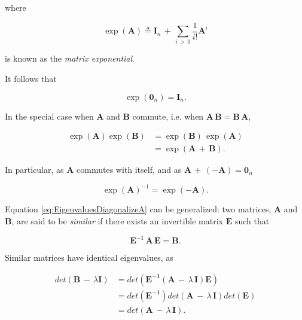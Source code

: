 \documentclass[graybox,envcountchap,sectrefs]{svmono}\usepackage[]{graphicx}\usepackage[]{xcolor}
\begin{document}
\begin{appendices}
where 

\begin{equation}
\exp\left(\mathrm{\mathbf{A}}\right)\triangleq\mathbf{I}_{n}\,+\,\sum_{i\,>\,0}\frac{1}{i!}\mathrm{\mathbf{A}}^{i}\label{eq:MatrixExponential}
\end{equation}
 

is known as the \emph{matrix exponential}. 

It follows that

\begin{equation}
\exp\left(\mathrm{\mathbf{0}}_{n}\right)=\mathbf{I}_{n}.\label{eq:MatrixExponential0}
\end{equation}

In the special case when $\mathbf{A}$ and $\mathbf{B}$ commute,
i.e. when $\mathbf{A}\,\mathbf{B}=\mathbf{B}\,\mathbf{A}$,

\begin{align}
\exp\left(\mathrm{\mathbf{A}}\right)\exp\left(\mathrm{\mathbf{B}}\right) & =\exp\left(\mathrm{\mathbf{B}}\right)\,\exp\left(\mathrm{\mathbf{A}}\right)\nonumber \\
 & =\exp\left(\mathrm{\mathbf{A}}\,+\,\mathrm{\mathbf{B}}\right).\label{eq:MatrixExponentialProduct}
\end{align}

In particular, as $\mathrm{\mathbf{A}}$ commutes with itself, and
as $\mathrm{\mathbf{A}\,+}\,\left(-\mathrm{\mathbf{A}}\right)=\mathbf{0}_{n}$

\begin{equation}
\exp\left(\mathrm{\mathbf{A}}\right)^{-1}=\exp\left(-\mathrm{\mathbf{A}}\right).\label{eq:MatrixExponentialInverse}
\end{equation}

Equation \eqref{eq:EigenvaluesDiagonalizeA} can be generalized: two
matrices, $\mathrm{\mathbf{A}}$ and $\mathrm{\mathbf{B}}$, are said
to be \emph{similar} if there exists an invertible matrix $\mathrm{\mathbf{E}}$
such that 

\begin{equation}
\mathbf{E}^{-1}\,\mathbf{A}\,\mathbf{\mathbf{E}}=\mathbf{B}.\label{eq:SimilarMatrices1}
\end{equation}

Similar matrices have identical eigenvalues, as

\begin{align}
det\left(\mathbf{B}\,-\,\lambda\mathrm{\mathbf{I}}\right) & =det\left(\mathbf{\mathbf{E}^{-1}}\left(\mathbf{A}\,-\,\lambda\,\mathrm{\mathbf{I}}\right)\mathbf{\mathbf{E}}\right)\nonumber \\
 & =det\left(\mathbf{\mathbf{E}^{-1}}\right)det\left(\mathbf{A}\,-\,\lambda\,\mathrm{\mathbf{I}}\right)det\left(\mathbf{\mathbf{E}}\right)\nonumber \\
 & =det\left(\mathbf{A}\,-\,\lambda\,\mathrm{\mathbf{I}}\right).\label{eq:SimilarMatrices2}
\end{align}



\end{appendices}
\end{document}
